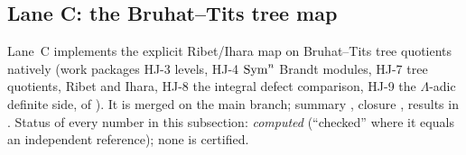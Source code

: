 \subsection{Lane C: the Bruhat--Tits tree map}\label{ss:hacs-lanec}
Lane~C implements the explicit Ribet/Ihara map on Bruhat--Tits tree quotients natively (work packages HJ-3 levels, HJ-4
$\mathrm{Sym}^n$ Brandt modules, HJ-7 tree quotients, Ribet and Ihara, HJ-8 the integral defect comparison, HJ-9 the $\Lambda$-adic
definite side, of ). It is merged on the main branch; summary
, closure ,
results in . Status of every number in this subsection: \emph{computed} (``checked'' where it equals an
independent reference); none is certified.
